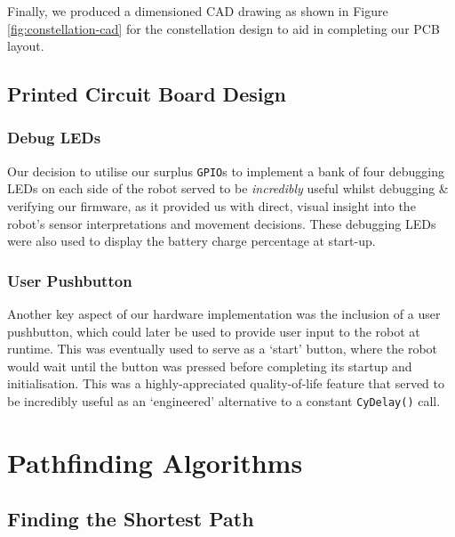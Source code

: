 \documentclass[conference]{IEEEtran}
\begin{document}
Finally, we produced a dimensioned CAD drawing as shown in Figure \ref{fig:constellation-cad} for the constellation design to aid in completing our PCB layout.

\subsection{Printed Circuit Board Design}


\subsubsection{Debug LEDs}

Our decision to utilise our surplus \texttt{GPIO}s to implement a bank of four debugging LEDs on each side of the robot served to be \emph{incredibly} useful whilst debugging \& verifying our firmware, as it provided us with direct, visual insight into the robot's sensor interpretations and movement decisions.
These debugging LEDs were also used to display the battery charge percentage at start-up.

\subsubsection{User Pushbutton}

Another key aspect of our hardware implementation was the inclusion of a user pushbutton, which could later be used to provide user input to the robot at runtime.
This was eventually used to serve as a `start' button, where the robot would wait until the button was pressed before completing its startup and initialisation.
This was a highly-appreciated quality-of-life feature that served to be incredibly useful as an `engineered' alternative to a constant \texttt{CyDelay()} call.



\section{Pathfinding Algorithms \label{sect:pathfinding-algorithms}}

\subsection{Finding the Shortest Path}
\end{document}
